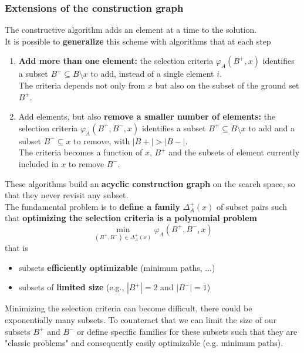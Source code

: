 \documentclass[11pt]{article}
\begin{document}
	\newpage
	
	\subsubsection{Extensions of the construction graph}
	The constructive algorithm adds an element at a time to the solution.\\
	
	It is possible to \textbf{generalize} this scheme with algorithms that at each step
	\begin{enumerate}
		\item \textbf{Add more than one element:} the selection criteria $\varphi_A (B^+, x)$ identifies a subset $B^+ \subseteq B \setminus x$ to add, instead of a single element $i$. \\
		The criteria depends not only from $x$ but also on the subset of the ground set $B^+$.\\
		
		\item Add elements, but also \textbf{remove a smaller number of elements:} the selection criteria $\varphi_A (B^+, B^-, x)$ identifies a subset $B^+ \subseteq B \setminus x$ to add and a subset $B^- \subseteq x$ to remove, with $|B+| > |B-|$. \\
		The criteria becomes a function of $x$, $B^+$ and the subsets of element currently included in $x$ to remove $B^-$.\\
	\end{enumerate}
	
	These algorithms build an \textbf{acyclic construction graph} on the search space, so that they never revisit any subset.\\
	
	The fundamental problem is to \textbf{define a family} $\Delta_A^+ (x)$ of subset pairs such that \textbf{optimizing the selection criteria is a polynomial problem}
	$$ \min_{(B^+, B^-) \in \Delta_A^+ (x)} \varphi_A (B^+, B^-, x) $$
	that is
	\begin{itemize}
		\item subsets \textbf{efficiently optimizable} (minimum paths, ...)
		\item subsets of \textbf{limited size} (e.g., $|B^+| = 2$ and $|B^-| = 1$)
	\end{itemize}
	
	Minimizing the selection criteria can become difficult, there could be exponentially many subsets. To counteract that we can limit the size of our subsets $B^+$ and $B^-$ or define specific families for these subsets such that they are "classic problems" and consequently easily optimizable (e.g. minimum paths).\\
	
\end{document}
